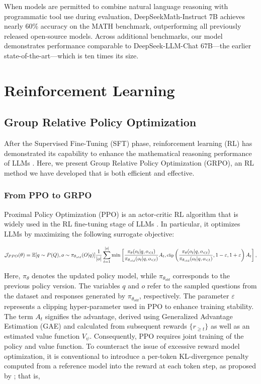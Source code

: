 \begin{itemize}[topsep=0pt]
\begin{itemize}[topsep=0pt]
When models are permitted to combine natural language reasoning with programmatic tool use during evaluation, DeepSeekMath-Instruct 7B achieves nearly 60\% accuracy on the MATH benchmark, outperforming all previously released open-source models. Across additional benchmarks, our model demonstrates performance comparable to DeepSeek-LLM-Chat 67B—the earlier state-of-the-art—which is ten times its size.
\section{Reinforcement Learning}

\subsection{Group Relative Policy Optimization} After the Supervised Fine-Tuning (SFT) phase, reinforcement learning (RL) has demonstrated its capability to enhance the mathematical reasoning performance of LLMs \citep{wang2023math,wizardmath}. Here, we present Group Relative Policy Optimization (GRPO), an RL method we have developed that is both efficient and effective.

\subsubsection{From PPO to GRPO} Proximal Policy Optimization (PPO) \citep{schulman2017proximal} is an actor-critic RL algorithm that is widely used in the RL fine-tuning stage of LLMs \citep{ouyang2022training}. In particular, it optimizes LLMs by maximizing the following surrogate objective:

\begin{equation}
\footnotesize
    \mathcal{J}_{PPO}(\theta) = \mathbb{E}{[q \sim P(Q), o \sim \pi_{\theta_{old}}(O|q)]} \frac{1}{|o|} \sum_{t=1}^{|o|} \min \left[ \frac{\pi_\theta(o_{t} | q, o_{<t})}{\pi_{\theta_{old}}(o_{t} | q, o_{<t})} A_{t}, \text{clip} \left( \frac{\pi_\theta(o_{t} | q, o_{<t})}{\pi_{\theta_{old}}(o_{t} | q, o_{<t})}, 1 - \varepsilon, 1 + \varepsilon \right)  A_{t} \right] ,
\end{equation}

Here, $\pi_{\theta}$ denotes the updated policy model, while $\pi_{\theta_{old}}$ corresponds to the previous policy version. The variables $q$ and $o$ refer to the sampled questions from the dataset and responses generated by $\pi_{\theta_{old}}$, respectively. The parameter $\varepsilon$ represents a clipping hyper-parameter used in PPO to enhance training stability. The term $A_t$ signifies the advantage, derived using Generalized Advantage Estimation (GAE) \citep{gae} and calculated from subsequent rewards $\{r_{\ge t}\}$ as well as an estimated value function $V_{\psi}$. Consequently, PPO requires joint training of the policy and value function. To counteract the issue of excessive reward model optimization, it is conventional to introduce a per-token KL-divergence penalty computed from a reference model into the reward at each token step, as proposed by \citep{ouyang2022training}; that is,


\end{itemize}
\end{itemize}
